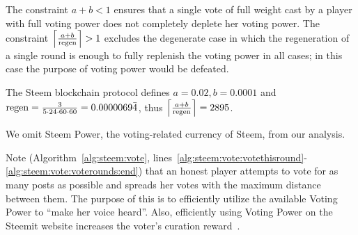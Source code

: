 \begin{remark}
  The constraint $a + b < 1$ ensures that a single vote of full weight cast by a
  player with full voting power does not completely deplete her voting power.
  The constraint $\ceil*{\frac{a + b}{\regen}} > 1$ excludes the degenerate
  case in which the regeneration of a single round is enough to fully replenish
  the voting power in all cases; in this case the purpose of voting power would
  be defeated.
\end{remark}

\begin{remark}
  The Steem blockchain protocol defines $a = 0.02, b = 0.0001$ and $\regen =
  \frac{3}{5 \cdot 24 \cdot 60 \cdot 60} = 0.0000069\bar{4}$, thus
  $\ceil*{\frac{a + b}{\regen}} = 2895$.
\end{remark}

\begin{remark}
  We omit Steem Power, the voting-related currency of Steem, from our analysis.
\end{remark}

\begin{remark}
  Note (Algorithm~\ref{alg:steem:vote},
  lines~\ref{alg:steem:vote:votethisround}-\ref{alg:steem:vote:voterounds:end})
  that an honest player attempts to vote for as many posts as possible and
  spreads her votes with the maximum distance between them. The purpose of this
  is to efficiently utilize the available Voting Power to ``make her voice
  heard''. Also, efficiently using Voting Power on the Steemit website increases
  the voter's curation reward~\cite{curationRewards}.
\end{remark}
